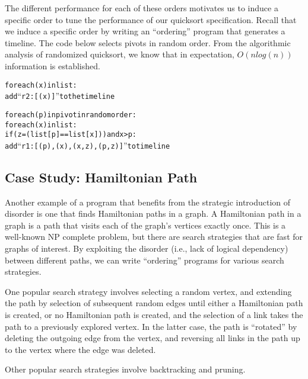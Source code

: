 The different performance for each of these orders motivates us to induce a specific order to tune the performance of our quicksort specification.  Recall that we induce a specific order by writing an ``ordering'' program that generates a timeline.  The code below selects pivots in random order.  From the algorithmic analysis of randomized quicksort, we know that in expectation, $O(n log(n))$ information is established.

\begin{alltt}
for each (x) in list:
    add ``r2 : [(x)]'' to the timeline

for each (p) in pivot in random order:
    for each (x) in list:
        if (z = (list[p] == list[x])) and x > p:
            add ``r1 : [(p),(x),(x,z),(p,z)]'' to timeline
\end{alltt}


\subsection{Case Study: Hamiltonian Path}

Another example of a program that benefits from the strategic introduction of disorder is one that finds Hamiltonian paths in a graph.  A Hamiltonian path in a graph is a path that visits each of the graph's vertices exactly once.  This is a well-known NP complete problem, but there are search strategies that are fast for graphs of interest.  By exploiting the disorder (i.e., lack of logical dependency) between different paths, we can write ``ordering'' programs for various search strategies.

One popular search strategy involves selecting a random vertex, and extending the path by selection of subsequent random edges until either a Hamiltonian path is created, or no Hamiltonian path is created, and the selection of a link takes the path to a previously explored vertex.  In the latter case, the path is ``rotated'' by deleting the outgoing edge from the vertex, and reversing all links in the path up to the vertex where the edge was deleted.

Other popular search strategies involve backtracking and pruning.


